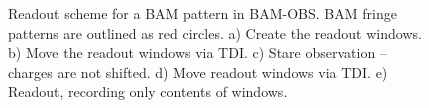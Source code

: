 \documentclass[a4paper, 11pt]{article}
\begin{document}
\begin{figure}[h]
%
%
%
%
%
%
%
%
%
%
%
  \caption{Readout scheme for a BAM pattern in BAM-OBS. BAM fringe patterns are outlined as red circles. a) Create the readout windows. b) Move the readout windows via TDI. c) Stare observation -- charges are not shifted. d) Move readout windows via TDI. e) Readout, recording only contents of windows.}
  \label{fig:BAM_Acq}
\end{figure}
\end{document}
